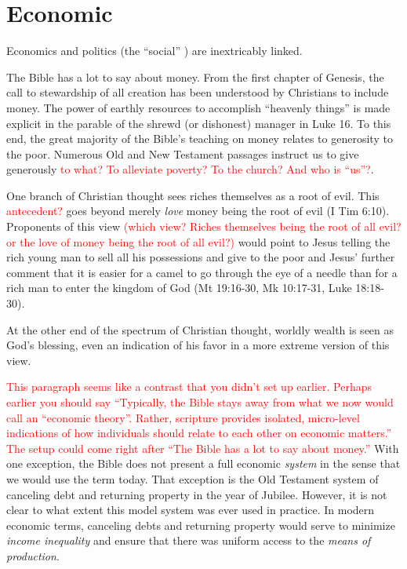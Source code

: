 \documentclass[12pt]{article}
\newcommand{\ins}[1]{\textcolor{red}{#1}}
\begin{document}
\section{Economic}
\label{sec:economic}
Economics and politics (the ``social'' ) are inextricably linked.

The Bible has a lot to say about money. From the first chapter of Genesis, the call to
stewardship of all creation has been understood by Christians to include money. The power
of earthly resources to accomplish ``heavenly things'' is made explicit in the parable of
the shrewd (or dishonest) manager in Luke 16. To this end, the great majority of the
Bible's teaching on money relates to generosity to the poor. Numerous Old and New
Testament passages instruct us to give generously 
\ins{to what? To alleviate poverty? To the church?  And who is ``us''?}.

One branch of Christian thought sees riches themselves as a root of evil. 
This \ins{antecedent?} goes beyond
merely \emph{love} money being the root of evil (I Tim 6:10). Proponents of this view
\ins{(which view? Riches themselves being the root of all evil?
or the love of money being the root of all evil?)}
would point to Jesus telling the rich young man to sell all his possessions and give to
the poor and Jesus' further comment that it is easier for a camel to go through the eye of
a needle than for a rich man to enter the kingdom of God (Mt 19:16-30, Mk 10:17-31, Luke
18:18-30).

At the other end of the spectrum of Christian thought, worldly wealth is seen as God's
blessing, even an indication of his favor in a more extreme version of this view.

\ins{This paragraph seems like a contrast that you didn't set up earlier. 
Perhaps earlier you should say ``Typically, the Bible stays away from 
what we now would call an ``economic theory''. 
Rather, scripture provides isolated, micro-level indications of how individuals
should relate to each other on economic matters.''
The setup could come right after ``The Bible has a lot to say about money.''}
With one exception, the Bible does not present a full economic \emph{system} 
in the sense that we would use the term today.
That exception is the Old Testament system of canceling debt and returning property in the
year of Jubilee. However, it is not clear to what extent this model system was ever used in practice.
In modern economic terms, canceling debts and returning property would serve to minimize 
\emph{income inequality} and ensure that there was uniform access to the \emph{means of production}.
\end{document}
